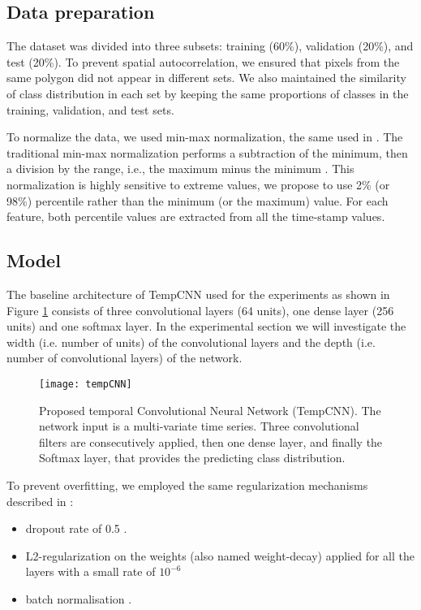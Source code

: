 \subsection{Data preparation}
\label{sec:tempCNNDataPreparation}

The dataset was divided into three subsets: training (60\%), validation (20\%), and test (20\%).
To prevent spatial autocorrelation, we ensured that pixels from the same polygon did not appear in different sets.
We also maintained the similarity of class distribution in each set by keeping the same proportions of classes in the training, validation, and test sets.

To normalize the data, we used min-max normalization, the same used in \cite{tempCNN}.
The traditional min-max normalization performs a subtraction of the minimum, then a division by the range, i.e., the maximum minus the minimum \cite{han2011data}.
This normalization is highly sensitive to extreme values, we propose to use 2\% (or 98\%) percentile rather than the minimum (or the maximum) value. 
For each feature, both percentile values are extracted from all the time-stamp values.


\subsection{Model}

The baseline architecture of TempCNN used for the experiments as shown in Figure \ref{tab:temCNNArchitecture} consists of three convolutional layers (64 units), one dense layer (256 units) and one softmax layer.
In the experimental section we will investigate the width (i.e. number of units) of the convolutional layers and the depth (i.e. number of convolutional layers) of the network.

\begin{figure}[H]
  \centering
  \texttt{[image: tempCNN]}
  \caption{Proposed temporal Convolutional Neural Network (TempCNN). The network input is a
  multi-variate time series. Three convolutional filters are consecutively applied, then one dense layer,
  and finally the Softmax layer, that provides the predicting class distribution.    \cite{tempCNN}}
  \label{tab:temCNNArchitecture}
\end{figure}


To prevent overfitting, we employed the same regularization mechanisms described in \cite{tempCNN}:

\begin{itemize}
  \item dropout rate of 0.5 \cite{JMLR:v15:srivastava14a}. 
  \item L2-regularization on the weights (also named weight-decay) applied for all the layers with a small rate of $10^{-6}$ 
  \item batch normalisation \cite{DBLP:journals/corr/IoffeS15}.
\end{itemize}


